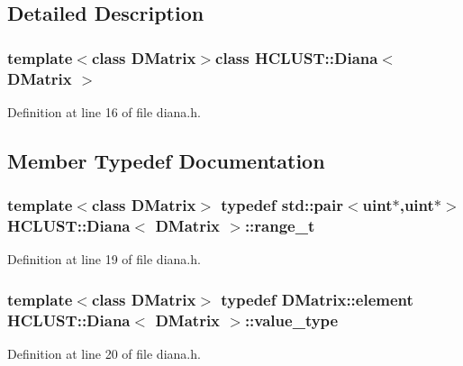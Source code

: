 \subsection{Detailed Description}
\subsubsection*{template$<$class D\+Matrix$>$class H\+C\+L\+U\+S\+T\+::\+Diana$<$ D\+Matrix $>$}



Definition at line 16 of file diana.\+h.



\subsection{Member Typedef Documentation}
\hypertarget{class_h_c_l_u_s_t_1_1_diana_acb3ccd562a49bbb37f4fbf540a758746}{
\subsubsection[{range\+\_\+t}]{\setlength{\rightskip}{0pt plus 5cm}template$<$class D\+Matrix$>$ typedef std\+::pair$<${\bf uint}$\ast$,{\bf uint}$\ast$$>$ {\bf H\+C\+L\+U\+S\+T\+::\+Diana}$<$ {\bf D\+Matrix} $>$\+::{\bf range\+\_\+t}}}\label{class_h_c_l_u_s_t_1_1_diana_acb3ccd562a49bbb37f4fbf540a758746}


Definition at line 19 of file diana.\+h.

\hypertarget{class_h_c_l_u_s_t_1_1_diana_a8f73768241022b8bb0b5ab3dfb448efc}{
\subsubsection[{value\+\_\+type}]{\setlength{\rightskip}{0pt plus 5cm}template$<$class D\+Matrix$>$ typedef D\+Matrix\+::element {\bf H\+C\+L\+U\+S\+T\+::\+Diana}$<$ {\bf D\+Matrix} $>$\+::{\bf value\+\_\+type}}}\label{class_h_c_l_u_s_t_1_1_diana_a8f73768241022b8bb0b5ab3dfb448efc}


Definition at line 20 of file diana.\+h.



